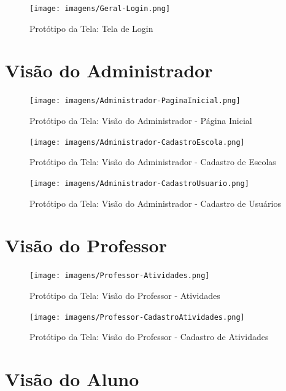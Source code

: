 \begin{apendicesenv}
\begin{figure}[htb]
    \centering
	\texttt{[image: imagens/Geral-Login.png]}
	\caption{\label{fig:login} Protótipo da Tela: Tela de Login}
\end{figure}
\FloatBarrier


\section{Visão do Administrador}

\begin{figure}[htb]
    \centering
	\texttt{[image: imagens/Administrador-PaginaInicial.png]}
	\caption{\label{fig:administrador} Protótipo da Tela: Visão do Administrador - Página Inicial}
\end{figure}
\FloatBarrier

\begin{figure}[htb]
    \centering
	\texttt{[image: imagens/Administrador-CadastroEscola.png]}
	\caption{\label{fig:cadastro-escola} Protótipo da Tela: Visão do Administrador - Cadastro de Escolas}
\end{figure}
\FloatBarrier

\begin{figure}[htb]
    \centering
	\texttt{[image: imagens/Administrador-CadastroUsuario.png]}
	\caption{\label{fig:cadastro-usuário} Protótipo da Tela: Visão do Administrador - Cadastro de Usuários}
\end{figure}
\FloatBarrier


\section{Visão do Professor}

\begin{figure}[htb]
    \centering
	\texttt{[image: imagens/Professor-Atividades.png]}
	\caption{\label{fig:atividades} Protótipo da Tela: Visão do Professor - Atividades}
\end{figure}
\FloatBarrier

\begin{figure}[htb]
    \centering
	\texttt{[image: imagens/Professor-CadastroAtividades.png]}
	\caption{\label{fig:professor} Protótipo da Tela: Visão do Professor - Cadastro de Atividades}
\end{figure}
\FloatBarrier


\section{Visão do Aluno}


\end{apendicesenv}
